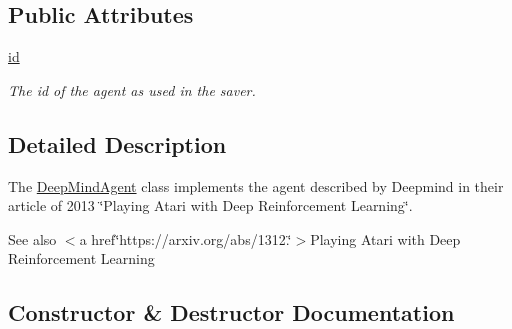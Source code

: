 \subsection*{Public Attributes}
\begin{DoxyCompactItemize}
\item 
\hyperlink{classDQN-Deepmind-NIPS-2013_1_1agent_1_1DeepMindAgent_1_1DeepMindAgent_a63e93b51f5b355b0896957d4484a8fb3}{id}
\begin{DoxyCompactList}\small\item\em The id of the agent as used in the saver. \end{DoxyCompactList}\end{DoxyCompactItemize}


\subsection{Detailed Description}
The \hyperlink{classDQN-Deepmind-NIPS-2013_1_1agent_1_1DeepMindAgent_1_1DeepMindAgent}{Deep\+Mind\+Agent} class implements the agent described by Deepmind in their article of 2013 \char`\"{}\+Playing Atari with Deep Reinforcement Learning\char`\"{}. 

\begin{DoxySeeAlso}{See also}
$<$a href\char`\"{}https\+://arxiv.\+org/abs/1312.\char`\"{}$>$Playing Atari with Deep Reinforcement Learning 
\end{DoxySeeAlso}


\subsection{Constructor \& Destructor Documentation}
\hypertarget{classDQN-Deepmind-NIPS-2013_1_1agent_1_1DeepMindAgent_1_1DeepMindAgent_a8bbe0f1127879b400142d5cf6fea5384}{}\label{classDQN-Deepmind-NIPS-2013_1_1agent_1_1DeepMindAgent_1_1DeepMindAgent_a8bbe0f1127879b400142d5cf6fea5384} 

